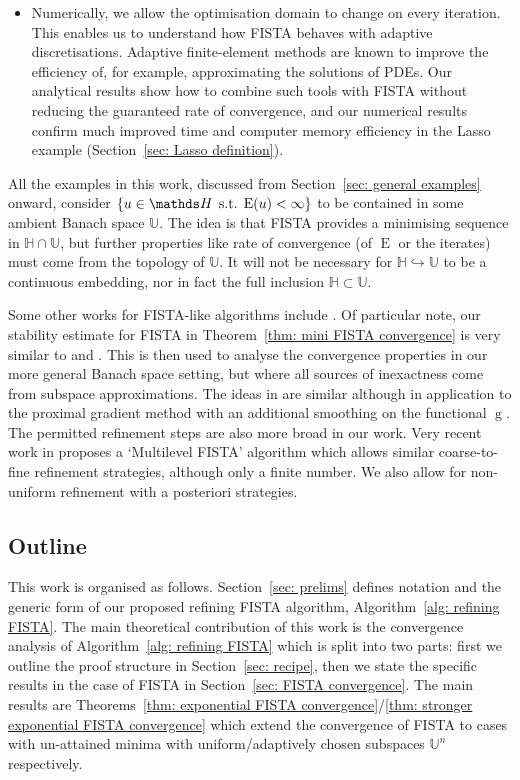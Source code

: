 \documentclass[smallextended]{svjour3}
\let\F\mathds\let\C\mathcal\newcommand{\R}{\F{R}}\newcommand{\A}{\tens{A}}
\newcommand{\op}[1]{\operatorname{#1}}
\newcommand{\1}{\F{1}}
\DeclareMathOperator{\st}{\;s.t.\;}
\newcommand*{\var}[1]{%
	\IfEqCase{#1}{%
		{0}{u}%
		{1}{v}%
		{2}{w}%
	}[u#1]%
}
\begin{document}
{\begin{itemize}
		\item Numerically, we allow the optimisation domain to change on every iteration. This enables us to understand how FISTA behaves with adaptive discretisations. Adaptive finite-element methods are known to improve the efficiency of, for example, approximating the solutions of PDEs. Our analytical results show how to combine such tools with FISTA without reducing the guaranteed rate of convergence, and our numerical results confirm much improved time and computer memory efficiency in the Lasso example (Section~\ref{sec: Lasso definition}).
	\end{itemize}
	All the examples in this work, discussed from Section~\ref{sec: general examples} onward, consider $\{\var0\in\F H\st \op{E}(\var0)<\infty\}$ to be contained in some ambient Banach space $\F{U}$. The idea is that FISTA provides a minimising sequence in $\F H\cap\F U$, but further properties like rate of convergence (of $\op{E}$ or the iterates) must come from the topology of $\F{U}$. It will not be necessary for $\F H\hookrightarrow\F U$ to be a continuous embedding, nor in fact the full inclusion $\F H\subset\F U$.
}
	
	Some other works for FISTA-like algorithms include \cite{Jiang2012,Villa2013}. Of particular note, our stability estimate for FISTA  in Theorem~\ref{thm: mini FISTA convergence} is very similar to \cite[Prop 2]{Schmidt2011} and \cite[Prop 3.3]{Aujol2015}. This is then used to analyse the convergence properties in our more general Banach space setting, but where all sources of inexactness come from subspace approximations. The ideas in \cite{Parpas2017} are similar although in application to the proximal gradient method with an additional smoothing on the functional $\op{g}$. The permitted refinement steps are also more broad in our work. Very recent work in \cite{Yu2021} proposes a `Multilevel FISTA' algorithm which allows similar coarse-to-fine refinement strategies, although only a finite number. We also allow for non-uniform refinement with a posteriori strategies.
	
	
	\subsection{Outline}
	This work is organised as follows. Section~\ref{sec: prelims} defines notation and the generic form of our proposed refining FISTA algorithm, Algorithm~\ref{alg: refining FISTA}. The main theoretical contribution of this work is the convergence analysis of Algorithm~\ref{alg: refining FISTA} which is split into two parts: first we outline the proof structure in Section~\ref{sec: recipe}, then we state the specific results in the case of FISTA in Section~\ref{sec: FISTA convergence}. The main results are Theorems~\ref{thm: exponential FISTA convergence}/\ref{thm: stronger exponential FISTA convergence} which extend the convergence of FISTA to cases with un-attained minima with uniform/adaptively chosen subspaces $\F{U}^n$ respectively. 
	
\end{document}

